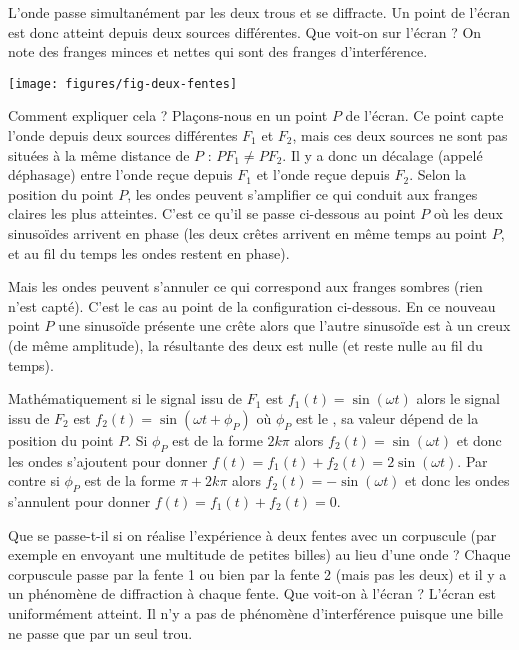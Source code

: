 \documentclass[11pt,class=report,crop=false]{standalone}
\begin{document}
 L'onde passe simultanément par les deux trous et se diffracte. Un point de l'écran est donc atteint depuis deux sources différentes. Que voit-on sur l'écran ? On note des franges minces et nettes qui sont des franges d'interférence. 

\begin{center}
\texttt{[image: figures/fig-deux-fentes]}
\end{center}

Comment expliquer cela ? Plaçons-nous en un point $P$ de l'écran. Ce point capte l'onde depuis deux sources différentes $F_1$ et $F_2$, mais ces deux sources ne sont pas situées à la même distance de $P$ : $PF_1 \neq PF_2$. Il y a donc un décalage (appelé déphasage) entre l'onde reçue depuis $F_1$ et l'onde reçue depuis $F_2$. Selon la position du point $P$, les ondes peuvent s'amplifier ce qui conduit aux franges claires les plus atteintes.
C'est ce qu'il se passe ci-dessous au point $P$ où les deux sinusoïdes arrivent en phase (les deux crêtes arrivent en même temps au point $P$, et au fil du temps les ondes restent en phase).


Mais les ondes peuvent s'annuler ce qui correspond aux franges sombres (rien n'est capté). C'est le cas au point de la configuration ci-dessous. En ce nouveau point $P$ une sinusoïde  présente une crête alors que l'autre sinusoïde est à un creux (de même amplitude), la résultante des deux est nulle (et reste nulle au fil du temps).



Mathématiquement si le signal issu de $F_1$ est $f_1(t) = \sin(\omega t)$
alors le signal issu de $F_2$ est $f_2(t) = \sin(\omega t + \phi_P)$ où $\phi_P$ est le , sa valeur dépend de la position du point $P$.
Si $\phi_P$ est de la forme $2k\pi$ alors $f_2(t) = \sin(\omega t)$ et donc les ondes s'ajoutent pour donner $f(t) = f_1(t)+f_2(t) = 2\sin(\omega t)$.
Par contre si $\phi_P$ est de la forme $\pi + 2k\pi$ alors $f_2(t) = -\sin(\omega t)$ et donc les ondes s'annulent pour donner $f(t) = f_1(t)+f_2(t) = 0$.


\bigskip

Que se passe-t-il si on réalise l'expérience à deux fentes avec un corpuscule (par exemple en envoyant une multitude de petites billes) au lieu d'une onde ? Chaque corpuscule passe par la fente 1 ou bien par la fente 2 (mais pas les deux) et il y a un phénomène de diffraction à chaque fente. Que voit-on à l'écran ? L'écran est uniformément atteint. Il n'y a pas de phénomène d'interférence puisque une bille ne passe que par un seul trou.
\end{document}
